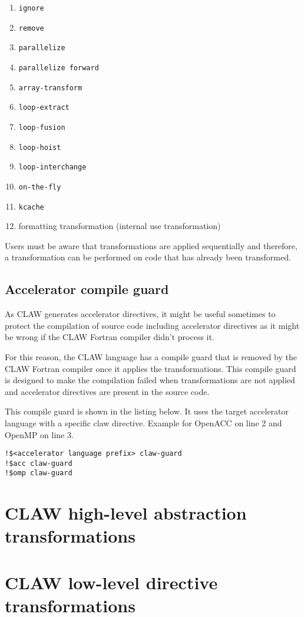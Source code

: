 \documentclass{article}
\begin{document}
\begin{enumerate}
\item \lstinline!ignore!
\item \lstinline!remove!
\item \lstinline!parallelize!
\item \lstinline!parallelize forward!
\item \lstinline!array-transform!
\item \lstinline!loop-extract!
\item \lstinline!loop-fusion!
\item \lstinline!loop-hoist!
\item \lstinline!loop-interchange!
\item \lstinline!on-the-fly!
\item \lstinline!kcache!
\item formatting transformation (internal use transformation)
\end{enumerate}

Users must be aware that transformations are applied sequentially and
therefore, a transformation can be performed on code that has already been transformed.

\subsection{Accelerator compile guard}
As CLAW generates accelerator directives, it might be useful sometimes to protect the compilation of source code including accelerator directives as it might be wrong if the CLAW Fortran compiler didn't process it. 

For this reason, the CLAW language has a compile guard that is removed by the CLAW Fortran compiler once it applies the transformations. This compile guard is designed to make the compilation failed when transformations are not applied and accelerator directives are present in the source code. 

This compile guard is shown in the listing below. It uses the target accelerator language with a specific claw directive. Example for OpenACC on line 2 and OpenMP on line 3. 

\begin{lstlisting}
!$<accelerator language prefix> claw-guard 
!$acc claw-guard
!$omp claw-guard
\end{lstlisting}

\section{CLAW high-level abstraction transformations}


\section{CLAW low-level directive transformations}




\appendix

\end{document}
